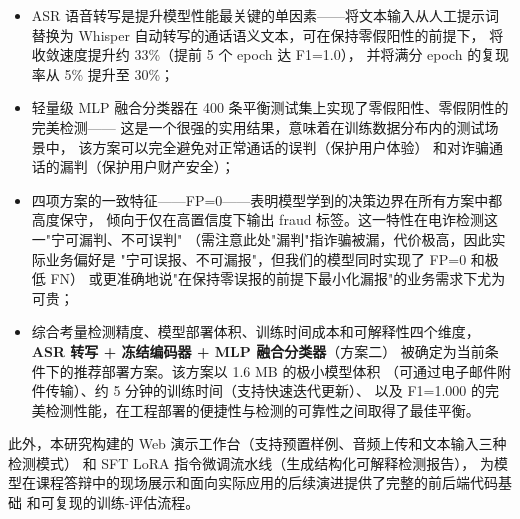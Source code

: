 \documentclass[11pt,a4paper]{ctexart}
\begin{document}
\begin{itemize}
  \item ASR 语音转写是提升模型性能最关键的单因素——将文本输入从人工提示词替换为
  Whisper 自动转写的通话语义文本，可在保持零假阳性的前提下，
  将收敛速度提升约 33\%（提前 5 个 epoch 达 F1=1.0），
  并将满分 epoch 的复现率从 5\% 提升至 30\%；

  \item 轻量级 MLP 融合分类器在 400 条平衡测试集上实现了零假阳性、零假阴性的完美检测——
  这是一个很强的实用结果，意味着在训练数据分布内的测试场景中，
  该方案可以完全避免对正常通话的误判（保护用户体验）
  和对诈骗通话的漏判（保护用户财产安全）；

  \item 四项方案的一致特征——FP=0——表明模型学到的决策边界在所有方案中都高度保守，
  倾向于仅在高置信度下输出 fraud 标签。这一特性在电诈检测这一"宁可漏判、不可误判"
  （需注意此处"漏判"指诈骗被漏，代价极高，因此实际业务偏好是
  "宁可误报、不可漏报"，但我们的模型同时实现了 FP=0 和极低 FN）
  或更准确地说"在保持零误报的前提下最小化漏报"的业务需求下尤为可贵；

  \item 综合考量检测精度、模型部署体积、训练时间成本和可解释性四个维度，
  \textbf{ASR 转写 + 冻结编码器 + MLP 融合分类器}（方案二）
  被确定为当前条件下的推荐部署方案。该方案以 1.6 MB 的极小模型体积
  （可通过电子邮件附件传输）、约 5 分钟的训练时间（支持快速迭代更新）、
  以及 F1=1.000 的完美检测性能，在工程部署的便捷性与检测的可靠性之间取得了最佳平衡。
\end{itemize}

此外，本研究构建的 Web 演示工作台（支持预置样例、音频上传和文本输入三种检测模式）
和 SFT LoRA 指令微调流水线（生成结构化可解释检测报告），
为模型在课程答辩中的现场展示和面向实际应用的后续演进提供了完整的前后端代码基础
和可复现的训练-评估流程。
\end{document}

